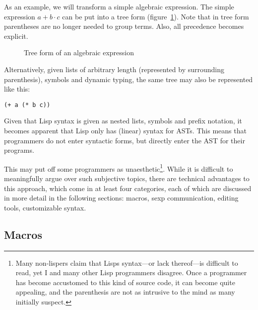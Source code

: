 \documentclass[a4paper,10pt,twoside]{report}
\begin{document}
As an example, we will transform a simple algebraic expression.  The simple
expression \(a + b \cdot c\) can be put into a tree form
(figure~\ref{fig:simple-tree}).  Note that in tree form parentheses are no
longer needed to group terms.  Also, all precedence becomes explicit.

\begin{figure}[h]
  \centering
  
  \caption{Tree form of an algebraic expression}
  \label{fig:simple-tree}
\end{figure}

Alternatively, given lists of arbitrary length (represented by surrounding
parenthesis), symbols and dynamic typing, the same tree may also be represented
like this:


\begin{lstlisting}[style=lispinline]
(+ a (* b c))
\end{lstlisting}

Given that Lisp syntax is given as nested lists, symbols and prefix notation, it
becomes apparent that Lisp only has (linear) syntax for ASTs.  This means that
programmers do not enter syntactic forms, but directly enter the AST for their
programs.

This may put off some programmers as unaesthetic\footnote{Many non-lispers claim
  that Lisps syntax---or lack thereof---is difficult to read, yet I and many
  other Lisp programmers disagree.  Once a programmer has become accustomed to
  this kind of source code, it can become quite appealing, and the parenthesis
  are not as intrusive to the mind as many initially suspect.}.  While it is
difficult to meaningfully argue over such subjective topics, there are technical
advantages to this approach, which come in at least four categories, each of
which are discussed in more detail in the following sections: macros, sexp
communication, editing tools, customizable syntax.

\subsection{Macros}
\label{subsec:macros}
\end{document}
